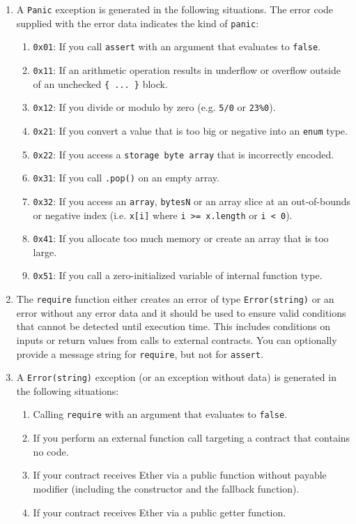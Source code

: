 \begin{enumerate}
\item A \verb|Panic| exception is generated in the following situations. The error code supplied with the error data indicates the kind of \verb|panic|:
    \begin{enumerate}
    \item\verb|0x01|: If you call \verb|assert| with an argument that evaluates to \verb|false|.
    \item\verb|0x11|: If an arithmetic operation results in underflow or overflow outside of an unchecked \verb|{ ... }| block.
    \item\verb|0x12|: If you divide or modulo by zero (e.g. \verb|5/0| or \verb|23%0|).
    \item\verb|0x21|: If you convert a value that is too big or negative into an \verb|enum| type.
    \item\verb|0x22|: If you access a \verb|storage byte array| that is incorrectly encoded.
    \item\verb|0x31|: If you call \verb|.pop()| on an empty array.
    \item\verb|0x32|: If you access an \verb|array|, \verb|bytesN| or an array slice at an out-of-bounds or negative index (i.e. \verb|x[i]| where \verb|i >= x.length| or \verb|i < 0|).
    \item\verb|0x41|: If you allocate too much memory or create an array that is too large.
    \item\verb|0x51|: If you call a zero-initialized variable of internal function type.
    \end{enumerate}

\item The \verb|require| function either creates an error of type \verb|Error(string)| or an error without any error data and it should be used to ensure valid conditions that cannot be detected until execution time. This includes conditions on inputs or return values from calls to external contracts. You can optionally provide a message string for \verb|require|, but not for \verb|assert|.

\item A \verb|Error(string)| exception (or an exception without data) is generated in the following situations:
    \begin{enumerate}
    \item Calling \verb|require| with an argument that evaluates to \verb|false|.
    \item If you perform an external function call targeting a contract that contains no code.
    \item If your contract receives Ether via a public function without payable modifier (including the constructor and the fallback function).
    \item If your contract receives Ether via a public getter function.
    \end{enumerate}


\end{enumerate}

